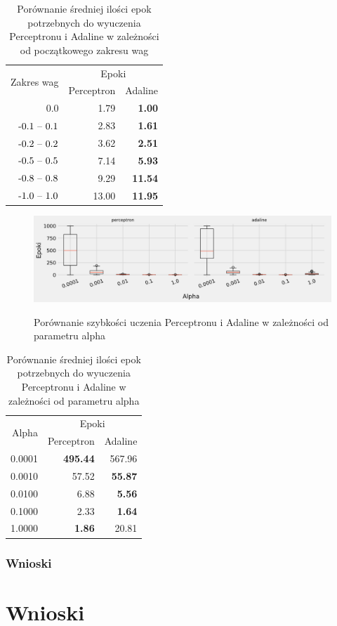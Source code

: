 \documentclass{article}
\begin{document}
\begin{table}[!h]
	\caption{Porównanie średniej ilości epok potrzebnych do wyuczenia Perceptronu i Adaline w zależności od początkowego zakresu wag}
	\label{tabela-res-81}
	\centering
	\begin{tabular}{rrr}
		\toprule
		\multirow{2}{*}{Zakres wag}   & \multicolumn{2}{c}{Epoki} \\
		                  & Perceptron & Adaline        \\
		\midrule
		0.0               & 1.79       & \textbf{1.00}  \\
		\($-0.1 -- 0.1$\) & 2.83       & \textbf{1.61}  \\
		\($-0.2 -- 0.2$\) & 3.62       & \textbf{2.51}  \\
		\($-0.5 -- 0.5$\) & 7.14       & \textbf{5.93}  \\
		\($-0.8 -- 0.8$\) & 9.29       & \textbf{11.54} \\
		\($-1.0 -- 1.0$\) & 13.00      & \textbf{11.95} \\
		\bottomrule
	\end{tabular}
\end{table}


\begin{figure}[!h]
	\centering
	\caption{Porównanie szybkości uczenia Perceptronu i Adaline w zależności od parametru alpha}
	\includegraphics[width=\textwidth]{ada_per_alpha.png}
	\label{fig:res82}
\end{figure}

\begin{table}[!h]
	\caption{Porównanie średniej ilości epok potrzebnych do wyuczenia Perceptronu i Adaline w zależności od parametru alpha}
	\label{tabela-res-82}
	\centering
	\begin{tabular}{rrr}
		\toprule
		\multirow{2}{*}{Alpha}   & \multicolumn{2}{c}{Epoki} \\
		       & Perceptron      & Adaline        \\
		\midrule
		0.0001 & \textbf{495.44} & 567.96         \\
		0.0010 & 57.52           & \textbf{55.87} \\
		0.0100 & 6.88            & \textbf{5.56}  \\
		0.1000 & 2.33            & \textbf{1.64}  \\
		1.0000 & \textbf{1.86}   & 20.81          \\
		\bottomrule
	\end{tabular}
\end{table}

\subsubsection*{Wnioski}

\newpage
\section{Wnioski}
\end{document}
